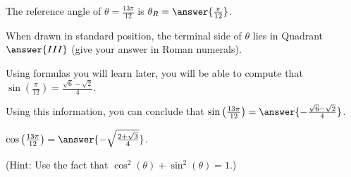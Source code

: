 \documentclass{ximera}
\author{Kenneth Berglund}
\begin{document}
\begin{exercise}
The reference angle of $\theta = \frac{13\pi}{12}$ is $\theta_R = \answer{\frac{\pi}{12}}$.

When drawn in standard position, the terminal side of $\theta$ lies in Quadrant $\answer{III}$ (give your answer in Roman numerals). 

\begin{exercise}
Using formulas you will learn later, you will be able to compute that $\sin\left(\frac{\pi}{12}\right) = \frac{\sqrt{6} - \sqrt{2}}{4}$.

Using this information, you can conclude that $\sin\left(\frac{13\pi}{12}\right) = \answer{-\frac{\sqrt{6} - \sqrt{2}}{4}}$.

\begin{exercise}
$\cos\left(\frac{13\pi}{12}\right) = \answer{-\sqrt{\frac{2 + \sqrt{3}}{4}}}$.

(Hint: Use the fact that $\cos^2(\theta) + \sin^2(\theta) = 1$.)
\end{exercise}
\end{exercise}

\end{exercise}
\end{document}

